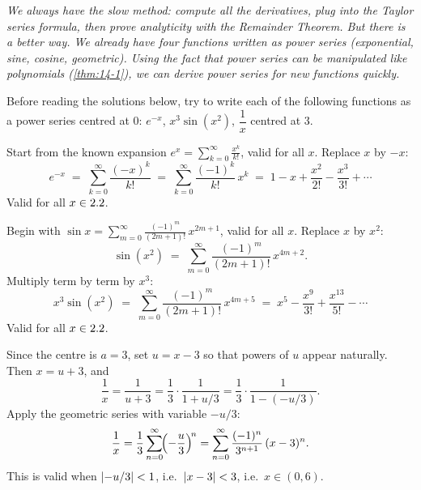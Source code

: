 \textit{We always have the slow method: compute all the derivatives, plug into the Taylor series formula, then prove analyticity with the Remainder Theorem.  But there is a better way.  We already have four functions written as power series (exponential, sine, cosine, geometric).  Using the fact that power series can be manipulated like polynomials (\cref{thm:14-1}), we can derive power series for new functions quickly.}

\begin{remark}
Before reading the solutions below, try to write each of the following functions as a power series centred at $0$: \quad $e^{-x}$, \quad $x^{3}\sin(x^{2})$, \quad $\dfrac{1}{x}$ centred at $3$.
\end{remark}

\begin{example}
\label{ex:14-6}
Start from the known expansion $e^{x}=\sum_{k=0}^{\infty}\frac{x^{k}}{k!}$, valid for all $x$.  Replace $x$ by $-x$:
\[
  e^{-x}
  \;=\; \sum_{k=0}^{\infty}\frac{(-x)^{k}}{k!}
  \;=\; \sum_{k=0}^{\infty}\frac{(-1)^{k}}{k!}\,x^{k}
  \;=\; 1 - x + \frac{x^{2}}{2!} - \frac{x^{3}}{3!} + \cdots
\]
Valid for all $x\in2.2$.
\end{example}

\begin{example}
\label{ex:14-7}
Begin with $\sin x = \sum_{m=0}^{\infty}\frac{(-1)^{m}}{(2m+1)!}\,x^{2m+1}$, valid for all $x$.  Replace $x$ by $x^{2}$:
\[
  \sin(x^{2})
  \;=\; \sum_{m=0}^{\infty}\frac{(-1)^{m}}{(2m+1)!}\,x^{4m+2}.
\]
Multiply term by term by $x^{3}$:
\[
  x^{3}\sin(x^{2})
  \;=\; \sum_{m=0}^{\infty}\frac{(-1)^{m}}{(2m+1)!}\,x^{4m+5}
  \;=\; x^{5} - \frac{x^{9}}{3!} + \frac{x^{13}}{5!} - \cdots
\]
Valid for all $x\in2.2$.
\end{example}

\begin{example}
\label{ex:14-8}
Since the centre is $a=3$, set $u=x-3$ so that powers of $u$ appear naturally.  Then $x=u+3$, and
\[
  \frac{1}{x} = \frac{1}{u+3}
  = \frac{1}{3}\cdot\frac{1}{1+u/3}
  = \frac{1}{3}\cdot\frac{1}{1-(-u/3)}.
\]
Apply the geometric series with variable $-u/3$:
\[
  \frac{1}{x}
  = \frac{1}{3}\sum_{n=0}^{\infty}\!\Bigl(-\frac{u}{3}\Bigr)^{\!n}
  = \sum_{n=0}^{\infty}\frac{(-1)^{n}}{3^{n+1}}\,(x-3)^{n}.
\]
This is valid when $\left\lvert -u/3 \right\rvert<1$, i.e.\ $\left\lvert x-3 \right\rvert<3$, i.e.\ $x\in(0,6)$.
\end{example}

